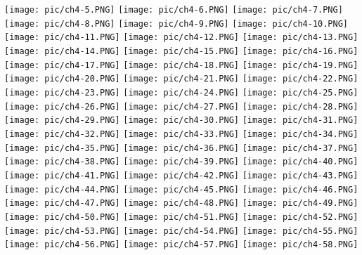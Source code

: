 \documentclass[UTF-8]{ctexart}
\begin{document}
\begin{center}
    \texttt{[image: pic/ch4-5.PNG]}
    \texttt{[image: pic/ch4-6.PNG]}
    \texttt{[image: pic/ch4-7.PNG]}
    \texttt{[image: pic/ch4-8.PNG]}
    \texttt{[image: pic/ch4-9.PNG]}
    \texttt{[image: pic/ch4-10.PNG]}
    \texttt{[image: pic/ch4-11.PNG]}
    \texttt{[image: pic/ch4-12.PNG]}
    \texttt{[image: pic/ch4-13.PNG]}
    \texttt{[image: pic/ch4-14.PNG]}
    \texttt{[image: pic/ch4-15.PNG]}
    \texttt{[image: pic/ch4-16.PNG]}
    \texttt{[image: pic/ch4-17.PNG]}
    \texttt{[image: pic/ch4-18.PNG]}
    \texttt{[image: pic/ch4-19.PNG]}
    \texttt{[image: pic/ch4-20.PNG]}
    \texttt{[image: pic/ch4-21.PNG]}
    \texttt{[image: pic/ch4-22.PNG]}
    \texttt{[image: pic/ch4-23.PNG]}
    \texttt{[image: pic/ch4-24.PNG]}
    \texttt{[image: pic/ch4-25.PNG]}
    \texttt{[image: pic/ch4-26.PNG]}
    \texttt{[image: pic/ch4-27.PNG]}
    \texttt{[image: pic/ch4-28.PNG]}
    \texttt{[image: pic/ch4-29.PNG]}
    \texttt{[image: pic/ch4-30.PNG]}
    \texttt{[image: pic/ch4-31.PNG]}
    \texttt{[image: pic/ch4-32.PNG]}
    \texttt{[image: pic/ch4-33.PNG]}
    \texttt{[image: pic/ch4-34.PNG]}
    \texttt{[image: pic/ch4-35.PNG]}
    \texttt{[image: pic/ch4-36.PNG]}
    \texttt{[image: pic/ch4-37.PNG]}
    \texttt{[image: pic/ch4-38.PNG]}
    \texttt{[image: pic/ch4-39.PNG]}
    \texttt{[image: pic/ch4-40.PNG]}
    \texttt{[image: pic/ch4-41.PNG]}
    \texttt{[image: pic/ch4-42.PNG]}
    \texttt{[image: pic/ch4-43.PNG]}
    \texttt{[image: pic/ch4-44.PNG]}
    \texttt{[image: pic/ch4-45.PNG]}
    \texttt{[image: pic/ch4-46.PNG]}
    \texttt{[image: pic/ch4-47.PNG]}
    \texttt{[image: pic/ch4-48.PNG]}
    \texttt{[image: pic/ch4-49.PNG]}
    \texttt{[image: pic/ch4-50.PNG]}
    \texttt{[image: pic/ch4-51.PNG]}
    \texttt{[image: pic/ch4-52.PNG]}
    \texttt{[image: pic/ch4-53.PNG]}
    \texttt{[image: pic/ch4-54.PNG]}
    \texttt{[image: pic/ch4-55.PNG]}
    \texttt{[image: pic/ch4-56.PNG]}
    \texttt{[image: pic/ch4-57.PNG]}
    \texttt{[image: pic/ch4-58.PNG]}

\end{center}
\end{document}
